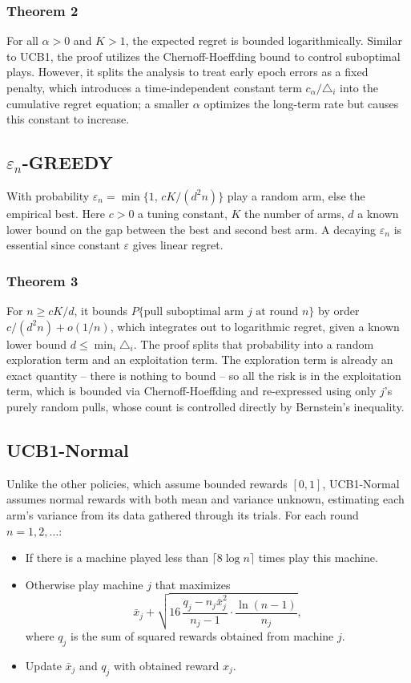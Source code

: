\documentclass[10pt]{article}
\begin{document}
\subsubsection{Theorem 2}
For all $\alpha>0$ and $K>1$, the expected regret is bounded logarithmically. Similar to UCB1, the proof
utilizes the Chernoff-Hoeffding bound to control suboptimal plays. However, it splits the analysis to treat
early epoch errors as a fixed penalty, which introduces a time-independent constant term $c_{\alpha}/\triangle_{i}$ into the
cumulative regret equation; a smaller $\alpha$ optimizes the long-term rate but causes this constant to increase.

\subsection{$\varepsilon_{n}$-GREEDY}
With probability $\varepsilon_{n}=\min\!\big\{1,\,cK/(d^{2}n)\big\}$ play a random arm, else the empirical best. Here $c>0$ a tuning
constant, $K$ the number of arms, $d$ a known lower bound on the gap between the best and second best arm. A
decaying $\varepsilon_{n}$ is essential since constant $\varepsilon$ gives linear regret.

\subsubsection{Theorem 3}
For $n\geq cK/d$, it bounds $P\{\text{pull suboptimal arm } j \text{ at round } n\}$ by order $c/(d^{2}n)+o(1/n)$, which integrates
out to logarithmic regret, given a known lower bound $d\leq\min_{i}\triangle_{i}$. The proof splits that probability into a
random exploration term and an exploitation term. The exploration term is already an exact quantity -- there is
nothing to bound -- so all the risk is in the exploitation term, which is bounded via Chernoff-Hoeffding and
re-expressed using only $j$'s purely random pulls, whose count is controlled directly by Bernstein's inequality.

\subsection{UCB1-Normal}
Unlike the other policies, which assume bounded rewards $[0,1]$, UCB1-Normal assumes normal rewards
with both mean and variance unknown, estimating each arm's variance from its data gathered through its
trials. For each round $n=1,2,\dots$:
\begin{itemize}\setlength{\itemsep}{0pt}\setlength{\parskip}{0pt}\setlength{\topsep}{1pt}
  \item If there is a machine played less than $\lceil 8\log n\rceil$ times play this machine.
  \item Otherwise play machine $j$ that maximizes
  \[
  \bar{x}_{j}+\sqrt{16\,\frac{q_{j}-n_{j}\bar{x}_{j}^{2}}{n_{j}-1}\cdot\frac{\ln(n-1)}{n_{j}}},
  \]
  where $q_{j}$ is the sum of squared rewards obtained from machine $j$.
  \item Update $\bar{x}_{j}$ and $q_{j}$ with obtained reward $x_{j}$.
\end{itemize}
\end{document}
